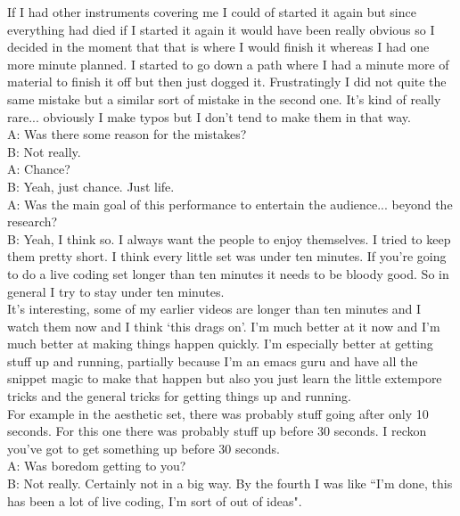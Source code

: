 If I had other instruments covering me I could of started it again but since everything had died if I started it again it would have been really obvious so I decided in the moment that that is where I would finish it whereas I had one more minute planned. I started to go down a path where I had a minute more of material to finish it off but then just dogged it. Frustratingly I did not quite the same mistake but a similar sort of mistake in the second one. It's kind of really rare... obviously I make typos but I don't tend to make them in that way.\\

A: Was there some reason for the mistakes?\\

B: Not really.\\

A: Chance?\\

B: Yeah, just chance. Just life.\\

A: Was the main goal of this performance to entertain the audience... beyond the research?\\

B: Yeah, I think so. I always want the people to enjoy themselves. I tried to keep them pretty short. I think every little set was under ten minutes. If you're going to do a live coding set longer than ten minutes it needs to be bloody good. So in general I try to stay under ten minutes.\\

It's interesting, some of my earlier videos are longer than ten minutes and I watch them now and I think `this drags on'. I'm much better at it now and I'm much better at making things happen quickly. I'm especially better at getting stuff up and running, partially because I'm an emacs guru and have all the snippet magic to make that happen but also you just learn the little extempore tricks and the general tricks for getting things up and running.\\

For example in the aesthetic set, there was probably stuff going after only 10 seconds. For this one there was probably stuff up before 30 seconds. I reckon you've got to get something up before 30 seconds.\\

A: Was boredom getting to you?\\

B: Not really. Certainly not in a big way. By the fourth I was like ``I'm done, this has been a lot of live coding, I'm sort of out of ideas".\\

